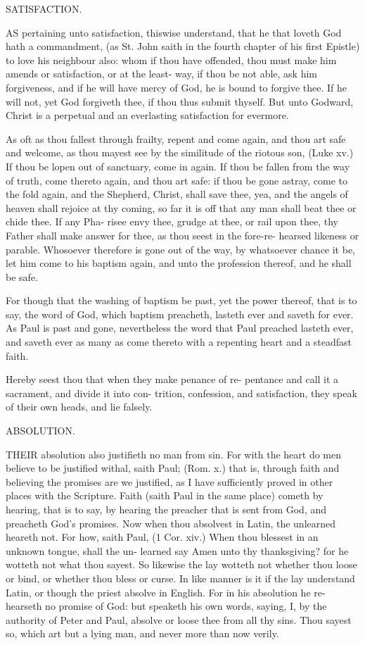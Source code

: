 \documentclass{custom}
\begin{document}
SATISFACTION. 

AS pertaining unto satisfaction, thiswise understand, 
that he that loveth God hath a commandment, (as 
St. John saith in the fourth chapter of his first Epistle) 
to love his neighbour also: whom if thou have offended, 
thou must make him amends or satisfaction, or at the least- 
way, if thou be not able, ask him forgiveness, and if he will 
have mercy of God, he is bound to forgive thee. If he will 
not, yet God forgiveth thee, if thou thus submit thyself. 
But unto Godward, Christ is a perpetual and an everlasting 
satisfaction for evermore. 

As oft as thou fallest through frailty, repent and come 
again, and thou art safe and welcome, as thou mayest 
see by the similitude of the riotous son, (Luke xv.) 
If thou be lopen out of sanctuary, come in again. If 
thou be fallen from the way of truth, come thereto again, 
and thou art safe: if thou be gone astray, come to the fold 
again, and the Shepherd, Christ, shall save thee, yea, and the 
angels of heaven shall rejoice at thy coming, so far it is off 
that any man shall beat thee or chide thee. If any Pha- 
risee envy thee, grudge at thee, or rail upon thee, thy Father 
shall make answer for thee, as thou seest in the fore-re- 
hearsed likeness or parable. Whosoever therefore is gone 
out of the way, by whatsoever chance it be, let him come 
to his baptism again, and unto the profession thereof, and 
he shall be safe. 

For though that the washing of baptism be past, yet the 
power thereof, that is to say, the word of God, which 
baptism preacheth, lasteth ever and saveth for ever. As 
Paul is past and gone, nevertheless the word that Paul 
preached lasteth ever, and saveth ever as many as come 
thereto with a repenting heart and a steadfast faith. 

Hereby seest thou that when they make penance of re- 
pentance and call it a sacrament, and divide it into con- 
trition, confession, and satisfaction, they speak of their own 
heads, and lie falsely. 


ABSOLUTION. 

THEIR absolution also justifieth no man from sin. For 
with the heart do men believe to be justified withal, 
saith Paul; (Rom. x.) that is, through faith and believing 
the promises are we justified, as I have sufficiently proved 
in other places with the Scripture. Faith (saith Paul in 
the same place) cometh by hearing, that is to say, by 
hearing the preacher that is sent from God, and preacheth 
God's promises. Now when thou absolvest in Latin, the 
unlearned heareth not. For how, saith Paul, (1 Cor. xiv.) 
When thou blessest in an unknown tongue, shall the un- 
learned say Amen unto thy thanksgiving? for he wotteth not 
what thou sayest. So likewise the lay wotteth not whether 
thou loose or bind, or whether thou bless or curse. In 
like manner is it if the lay understand Latin, or though the 
priest absolve in English. For in his absolution he re- 
hearseth no promise of God: but speaketh his own words, 
saying, I, by the authority of Peter and Paul, absolve or 
loose thee from all thy sins. Thou sayest so, which art 
but a lying man, and never more than now verily. 
\end{document}
